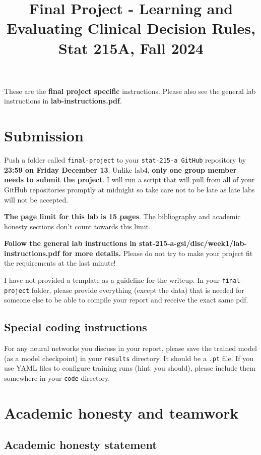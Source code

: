\documentclass[letterpaper,12pt]{article}
\title{Final Project - Learning and Evaluating Clinical Decision Rules, Stat 215A, Fall 2024\vspace{-2em}}
\date{}
\begin{document}
\maketitle

These are the \textbf{final project specific} instructions. Please also see the general lab instructions in \textbf{lab-instructions.pdf}.

\tableofcontents

\section{Submission}
Push a folder called \texttt{final-project} to your \texttt{stat-215-a GitHub} repository by \textbf{23:59 on Friday December 13}. Unlike lab4, \textbf{only one group member needs to submit the project}. I will run a script that will pull from all of your GitHub repositories promptly at midnight so take care not to be late as late labs will not be accepted.

\textbf{The page limit for this lab is 15 pages}. The bibliography and academic honesty sections don't count towards this limit.

\textbf{Follow the general lab instructions in stat-215-a-gsi/disc/week1/lab-instructions.pdf for more details.} Please do not try to make your project fit the requirements at the last minute!

I have not provided a template as a guideline for the writeup. In your \texttt{final-project} folder, please provide everything (except the data) that is needed for someone else to be able to compile your report and receive the exact same pdf.

\subsection{Special coding instructions}
For any neural networks you discuss in your report, please save the trained model (as a model checkpoint) in your \texttt{results} directory. It should be a \texttt{.pt} file. If you use YAML files to configure training runs (hint: you should), please include them somewhere in your \texttt{code} directory.

\section{Academic honesty and teamwork}

\subsection{Academic honesty statement}
\end{document}
